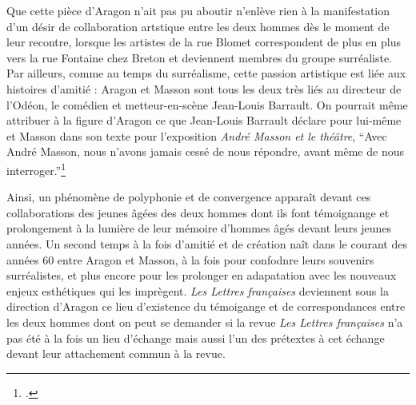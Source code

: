 	 Que cette pièce d'Aragon n'ait pas pu aboutir n'enlève rien à la manifestation d'un désir de collaboration artstique entre les deux hommes dès le moment de leur recontre, lorsque les artistes de la rue Blomet correspondent de plus en plus vers la rue Fontaine chez Breton et deviennent membres du groupe surréaliste. Par ailleurs, comme au temps du surréalisme, cette passion artistique est liée aux histoires d’amitié : Aragon et Masson sont tous les deux très liés au directeur de l’Odéon, le comédien et metteur-en-scène Jean-Louis Barrault. On pourrait même attribuer à la figure d'Aragon ce que Jean-Louis Barrault déclare pour lui-même et Masson dans son texte pour l'exposition \emph{André Masson et le théâtre}, \enquote{Avec André Masson, nous n'avons jamais cessé de nous répondre, avant même de nous interroger.}\footcite[p90]{catalogue}


	 Ainsi, un phénomène de polyphonie et de convergence apparaît devant ces collaborations des jeunes âgées des deux hommes dont ils font témoignange et prolongement à la lumière de leur mémoire d'hommes âgés devant leurs jeunes années. Un second temps à la fois d'amitié et de création naît dans le courant des années 60 entre Aragon et Masson, à la fois pour confodnre leurs souvenirs surréalistes, et plus encore pour les prolonger en adapatation avec les nouveaux enjeux esthétiques qui les imprègent. \emph{Les Lettres françaises} deviennent sous la direction d'Aragon ce lieu d'existence du témoigange et de correspondances entre les deux hommes dont on peut se demander si la revue \emph{Les Lettres françaises} n'a pas été à la fois un lieu d'échange mais aussi l'un des prétextes à cet échange devant leur attachement commun à la revue. 

 